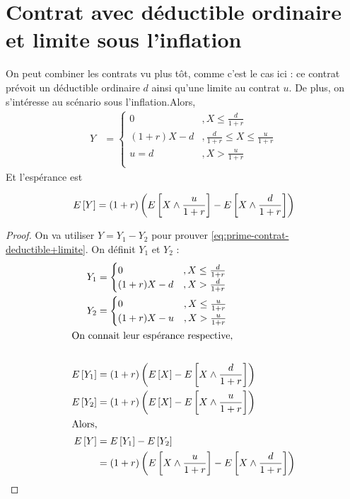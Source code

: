 \documentclass[12pt, french]{report}
\begin{document}
\section{Contrat avec déductible ordinaire et limite sous l'inflation}
On peut combiner les contrats vu plus tôt, comme c'est le cas ici : ce contrat prévoit un déductible ordinaire $d$ ainsi qu'une limite au contrat $u$. De plus, on s'intéresse au scénario sous l'inflation.Alors,
\begin{align*}
Y & = 
\begin{cases}
0				& , X \leq \frac{d}{1+r} \\
(1+r) X - d		& , \frac{d}{1+r} \leq X \leq \frac{u}{1+r} \\
u=d				& , X > \frac{u}{1+r} \\
\end{cases}
\end{align*}
Et l'espérance est
\begin{definition}
\begin{equation}
\label{eq:prime-contrat-deductible+limite}
E \left[ Y \right] = (1+r) \left( E \left[ X \wedge \frac{u}{1+r} \right] - E \left[ X \wedge \frac{d}{1+r} \right]   \right)
\end{equation}
\end{definition}

\begin{proof}
On va utiliser $Y = Y_1 - Y_2$ pour prouver \eqref{eq:prime-contrat-deductible+limite}. On définit $Y_1$ et $Y_2$ : 
\begin{align*}
Y_1	& = 
\begin{cases}
0				& , X \leq \frac{d}{1+r} \\
(1+r)X - d		& , X  > \frac{d}{1+r} \\
\end{cases} \\
Y_2	& = 
\begin{cases}
0				& , X \leq \frac{u}{1+r} \\
(1+r) X - u		& , X > \frac{u}{1+r} \\
\end{cases} \\
\shortintertext{On connait leur espérance respective,} \\
E \left[ Y_1 \right]	& = (1+r) \left( E \left[ X \right] - E \left[ X \wedge \frac{d}{1+r} \right] \right) \\
E \left[ Y_2 \right]	& = (1+r) \left(E \left[ X \right] - E \left[ X \wedge \frac{u}{1+r} \right] \right) \\
\shortintertext{Alors,}
E \left[ Y \right]		& = E \left[ Y_1 \right] - E \left[ Y_2 \right] \\
			& = (1+r) \left( E \left[ X \wedge \frac{u}{1+r} \right] - E \left[ X \wedge \frac{d}{1+r} \right]  \right) \\
\end{align*}
\end{proof}
\end{document}
